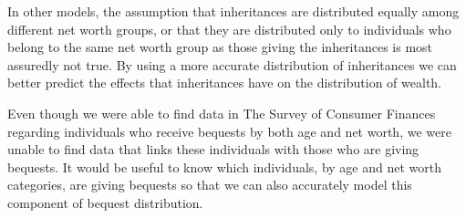 \documentclass[letterpaper,12pt]{article}
\theoremstyle{definition}
\begin{document}
\begin{spacing}{1.5}
  In other models, the assumption that inheritances are distributed equally among different net worth groups, or that they are distributed only to individuals who belong to the same net worth group as those giving the inheritances is most assuredly not true. By using a more accurate distribution of inheritances we can better predict the effects that inheritances have on the distribution of wealth.


  Even though we were able to find data in The Survey of Consumer Finances regarding individuals who receive bequests by both age and net worth, we were unable to find data that links these individuals with those who are giving bequests. It would be useful to know which individuals, by age and net worth categories, are giving bequests so that we can also accurately model this component of bequest distribution.



\clearpage


\end{spacing}


\newpage









\end{document}
